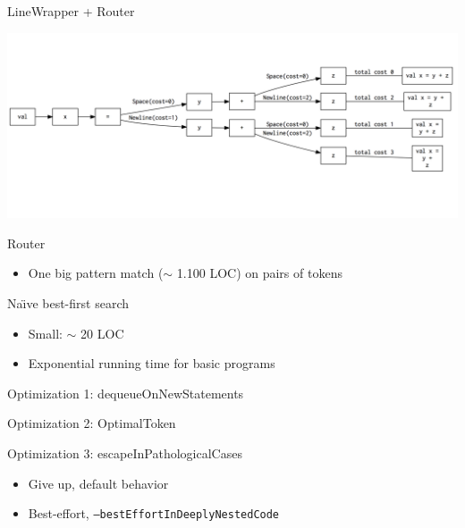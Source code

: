 \documentclass[xcolor=dvipsnames]{beamer}
\theoremstyle{definition}
\begin{document}
\begin{frame}{LineWrapper + Router}
  \begin{center}
    \includegraphics[width=\textwidth]{img/router2.png}
  \end{center}
\end{frame}

\begin{frame}{Router}
  \begin{itemize}
    \item One big pattern match ($\sim$ 1.100 LOC) on pairs of tokens
  \end{itemize}
  
\end{frame}

\newcommand{\naive}{Na\"{\i}ve}

\begin{frame}{\naive{} best-first search}
  \begin{itemize}
    \item Small: $\sim$ 20 LOC
    \item Exponential running time for basic programs
  \end{itemize}
\end{frame}


\begin{frame}{Optimization 1: dequeueOnNewStatements}
  
\end{frame}

\begin{frame}{Optimization 2: OptimalToken}
  
\end{frame}

\begin{frame}{Optimization 3: escapeInPathologicalCases}
  \begin{itemize}
    \item Give up, default behavior
    \item Best-effort, \texttt{--bestEffortInDeeplyNestedCode}
  \end{itemize}
  
\end{frame}
\end{document}
